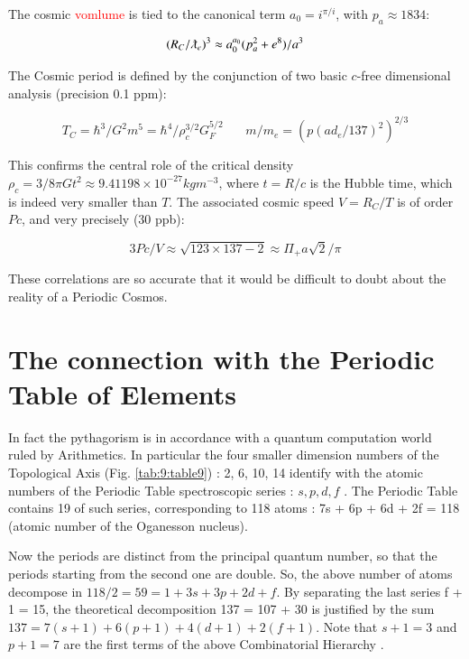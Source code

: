 \documentclass[a4paper,9pt]{article}
\begin{document}
The cosmic \textcolor{red}{vomlume} is tied to the canonical term $a_0 = i^{\pi/i}$, with $p_a\approx 1834$:

\begin{equation}
(R_C/\lambdabar_e)^3 \approx a_0^{a_0} (p_a^2 + e^8)/a^3
\end{equation}

The Cosmic period is defined by the conjunction of two basic $c$-free dimensional analysis (precision 0.1 ppm):

\begin{equation}
T_C = \hbar^3/G^2m^5 = \hbar^4/\rho_c^{3/2}G_F^{5/2} ~~~~~~~~   m/m_e = (p(ad_e/137)^2)^{2/3}
\end{equation}

This confirms the central role of the critical density $\rho_c = 3/8 \pi G t^2 \approx 9.41198 \times 10^{-27} kg m^{-3}$, where $t = R/c$ is the Hubble time, which is indeed very smaller than $T$. The associated cosmic speed $V = R_C/T$ is of order $Pc$, and very precisely (30 ppb):


\begin{equation}
3Pc/V \approx \sqrt{123 \times 137 - 2} \approx \Pi_+ a \sqrt {2} / \pi  
\end{equation}

These correlations are so accurate that it would be difficult to doubt about the reality of a Periodic Cosmos.





\section{The connection with the Periodic Table of Elements}

     In fact the pythagorism is in accordance with a quantum computation world ruled by Arithmetics. In particular the four smaller dimension numbers of the Topological Axis (Fig. \ref{tab:9:table9}) : 2, 6, 10, 14 identify with the atomic numbers of the Periodic Table spectroscopic series : $s, p, d, f$ . The Periodic Table contains 19 of such series, corresponding to 118 atoms : 7s + 6p + 6d + 2f = 118 (atomic number of the Oganesson nucleus). 
     

     Now the periods are distinct from the principal quantum number, so that the periods starting from the second one are double. So, the above number of atoms decompose in $118/2 = 59 = 1 + 3s + 3p + 2d + f$.  By separating the last series f + 1 = 15, the theoretical decomposition 137 = 107 + 30 is justified by the sum $137 = 7(s +1) + 6(p +1) + 4(d +1) + 2(f +1)$. Note that $s + 1 = 3$ and $p + 1 = 7$ are the first terms of the above Combinatorial Hierarchy\cite{Bastin} .
\end{document}
